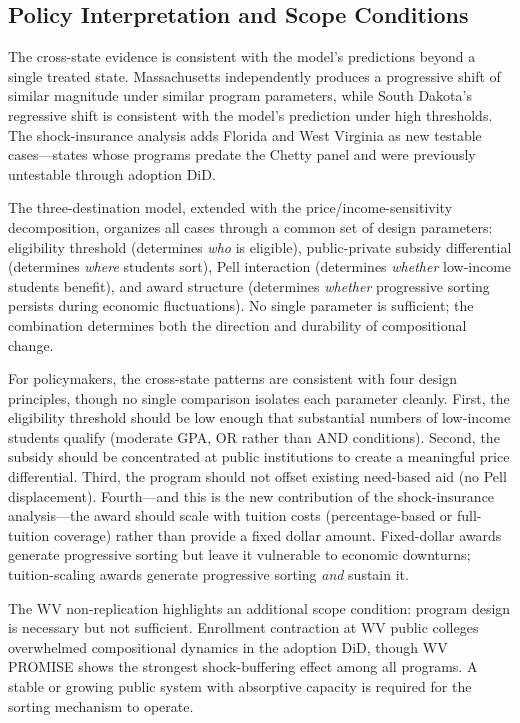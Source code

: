 \subsection{Policy Interpretation and Scope Conditions}

The cross-state evidence is consistent with the model's predictions
beyond a single treated state. Massachusetts independently produces
a progressive shift of similar magnitude under similar program
parameters, while South Dakota's regressive shift is consistent with
the model's prediction under high thresholds.
The shock-insurance analysis adds Florida and West Virginia as new
testable cases---states whose programs predate the Chetty panel and
were previously untestable through adoption DiD.

The three-destination model, extended with the price/income-sensitivity
decomposition,
organizes all cases through a common set of design parameters:
eligibility threshold (determines \emph{who} is eligible), public-private
subsidy differential (determines \emph{where} students sort),
Pell interaction (determines \emph{whether} low-income students benefit),
and award structure (determines \emph{whether} progressive sorting
persists during economic fluctuations). No single parameter is
sufficient; the combination determines both the direction and
durability of compositional change.

For policymakers, the cross-state patterns are consistent with four
design principles, though no single comparison isolates each parameter
cleanly. First, the eligibility threshold should be low enough that
substantial numbers of low-income students qualify (moderate GPA, OR
rather than AND conditions). Second, the subsidy should be concentrated
at public institutions to create a meaningful price differential.
Third, the program should not offset existing need-based aid (no Pell
displacement). Fourth---and this is the new contribution of the
shock-insurance analysis---the award should scale with tuition costs
(percentage-based or full-tuition coverage) rather than provide a
fixed dollar amount. Fixed-dollar
awards generate progressive sorting but leave it vulnerable to
economic downturns; tuition-scaling awards generate progressive sorting
\emph{and} sustain it.

The WV non-replication highlights an additional scope condition:
program design is necessary but not sufficient. Enrollment contraction
at WV public colleges overwhelmed compositional dynamics in the
adoption DiD, though WV PROMISE shows the strongest shock-buffering
effect among all programs. A stable or growing public system with
absorptive capacity is required for the sorting mechanism to operate.
